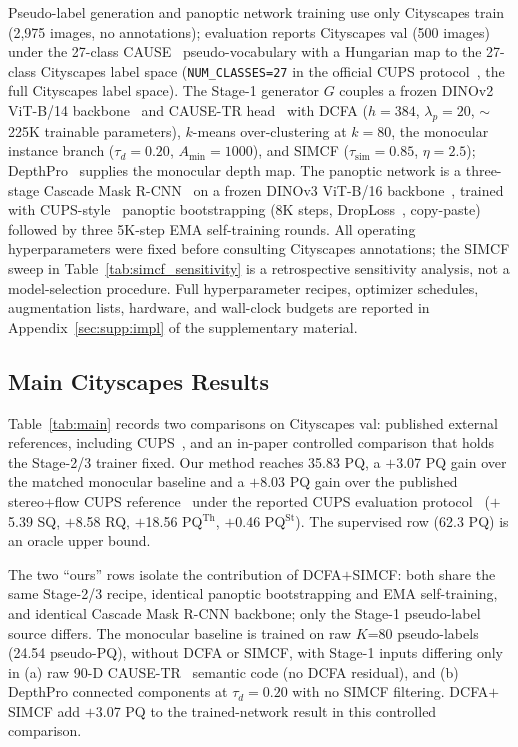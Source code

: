 \documentclass{article}
\begin{document}
Pseudo-label generation and panoptic network training use only Cityscapes train~\cite{cordts2016cityscapes} (2{,}975 images, no annotations); evaluation reports Cityscapes val (500 images) under the 27-class CAUSE~\cite{kim2024cause} pseudo-vocabulary with a Hungarian map to the 27-class Cityscapes label space (\texttt{NUM\_CLASSES=27} in the official CUPS protocol~\cite{hahn2025cups}, the full Cityscapes label space). The Stage-1 generator $G$ couples a frozen DINOv2 ViT-B/14 backbone~\cite{oquab2024dinov2} and CAUSE-TR head~\cite{kim2024cause} with DCFA ($h{=}384$, $\lambda_p{=}20$, $\sim$225K trainable parameters), $k$-means over-clustering at $k{=}80$, the monocular instance branch ($\tau_d{=}0.20$, $A_\text{min}{=}1000$), and SIMCF ($\tau_\text{sim}{=}0.85$, $\eta{=}2.5$); DepthPro~\cite{bochkovskii2024depthpro} supplies the monocular depth map. The panoptic network is a three-stage Cascade Mask R-CNN~\cite{cai2018cascade} on a frozen DINOv3 ViT-B/16 backbone~\cite{simeoni2025dinov3}, trained with CUPS-style~\cite{hahn2025cups} panoptic bootstrapping (8K steps, DropLoss~\cite{wang2023cutler}, copy-paste) followed by three 5K-step EMA self-training rounds. All operating hyperparameters were fixed before consulting Cityscapes annotations; the SIMCF sweep in Table~\ref{tab:simcf_sensitivity} is a retrospective sensitivity analysis, not a model-selection procedure. Full hyperparameter recipes, optimizer schedules, augmentation lists, hardware, and wall-clock budgets are reported in Appendix~\ref{sec:supp:impl} of the supplementary material.


\subsection{Main Cityscapes Results}
\label{sec:exp:main}

Table~\ref{tab:main} records two comparisons on Cityscapes val: published external references, including CUPS~\cite{hahn2025cups}, and an in-paper controlled comparison that holds the Stage-2/3 trainer fixed. Our method reaches 35.83 PQ, a $+$3.07 PQ gain over the matched monocular baseline and a $+$8.03 PQ gain over the published stereo+flow CUPS reference~\cite{hahn2025cups} under the reported CUPS evaluation protocol~\cite{hahn2025cups} ($+$5.39 SQ, $+$8.58 RQ, $+$18.56 PQ$^\text{Th}$, $+$0.46 PQ$^\text{St}$). The supervised row (62.3 PQ) is an oracle upper bound.

The two ``ours'' rows isolate the contribution of DCFA$+$SIMCF: both share the same Stage-2/3 recipe, identical panoptic bootstrapping and EMA self-training, and identical Cascade Mask R-CNN backbone; only the Stage-1 pseudo-label source differs. The monocular baseline is trained on raw $K$=80 pseudo-labels (24.54 pseudo-PQ), without DCFA or SIMCF, with Stage-1 inputs differing only in (a) raw 90-D CAUSE-TR~\cite{kim2024cause} semantic code (no DCFA residual), and (b) DepthPro connected components at $\tau_d = 0.20$ with no SIMCF filtering. DCFA$+$SIMCF add $+$3.07 PQ to the trained-network result in this controlled comparison.
\end{document}
